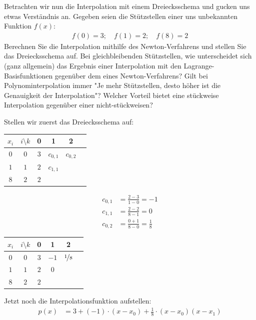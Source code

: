 {
	Betrachten wir nun die Interpolation mit einem Dreiecksschema und gucken uns etwas Verständnis an.
	}{
		\itemf Gegeben seien die Stützstellen einer uns unbekannten Funktion $f(x)$: 
		\begin{align*}
			f(0) = 3; \quad f(1) = 2; \quad f(8) = 2
		\end{align*}
		Berechnen Sie die Interpolation mithilfe des Newton-Verfahrens und stellen Sie das Dreiecksschema auf.
		\itemf Bei gleichbleibenden Stützstellen, wie unterscheidet sich (ganz allgemein) das Ergebnis einer Interpolation mit den Lagrange-Basisfunktionen gegenüber dem eines Newton-Verfahrens?
		\itemf Gilt bei Polynominterpolation immer "Je mehr Stützstellen, desto höher ist die Genauigkeit der Interpolation"?
		\itemf Welcher Vorteil bietet eine stückweise Interpolation gegenüber einer nicht-stückweisen?
	}{
		\itemf Stellen wir zuerst das Dreiecksschema auf:
		\begin{table}[H]
			\centering
			\begin{tabular}{cc|cccc}
				\toprule
				$x_i$  & $i \setminus k$ & 0 & 1 & 2 \\ \midrule
				$0$ & $0$ & $3$ & $c_{0,1}$ & $c_{0,2}$ \\
				$1$ & $1$ & $2$ & $c_{1,1}$ & \\
				$8$ & $2$ & $2$ & &
			\end{tabular}
		\end{table}%
		\begin{align*} 
			c_{0,1} &= \frac{2 - 3}{1 - 0} = -1 \\
			c_{1,1} &= \frac{2 - 2}{8 - 1} = 0 \\
			c_{0,2} &= \frac{0 + 1}{8 - 0} = \frac{1}{8}
		\end{align*}
		\begin{table}[H]
			\centering
			\begin{tabular}{cc|cccc}
				\toprule
				$x_i$  & $i \setminus k$ & 0 & 1 & 2 \\ \midrule
				$0$ & $0$ & $3$ & $-1$ & $\nicefrac{1}{8}$ \\
				$1$ & $1$ & $2$ & $0$ & \\
				$8$ & $2$ & $2$ & & \\
			\end{tabular}
		\end{table}
		Jetzt noch die Interpolationsfunktion aufstellen:
		\begin{align*}
			p(x) &= 3 + (-1) \cdot (x-x_0) + \frac{1}{8} \cdot (x-x_0)(x-x_1) \\

\end{align*}}
